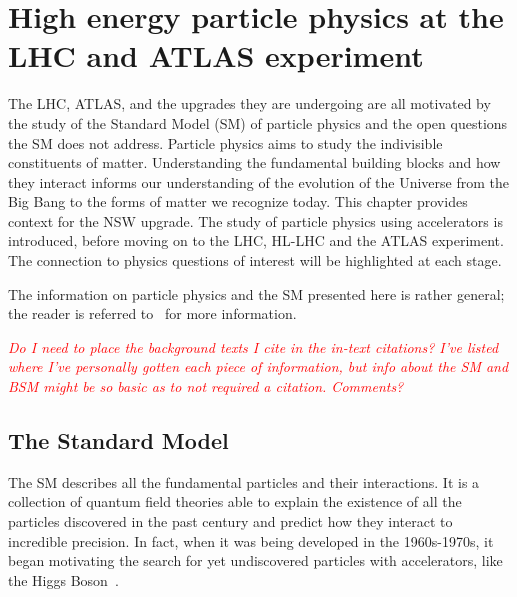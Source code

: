 
\chapter{High energy particle physics at the LHC and ATLAS experiment}
\label{chap:lhc_atlas}


The LHC, ATLAS, and the upgrades they are undergoing are all motivated by the study of the Standard Model (SM) of particle physics and the open questions the SM does not address. Particle physics aims to study the indivisible constituents of matter. Understanding the fundamental building blocks and how they interact informs our understanding of the evolution of the Universe from the Big Bang to the forms of matter we recognize today. This chapter provides context for the NSW upgrade. The study of particle physics using accelerators is introduced, before moving on to the LHC, HL-LHC and the ATLAS experiment. The connection to physics questions of interest will be highlighted at each stage. 

The information on particle physics and the SM presented here is rather general; the reader is referred to~\cite{griffiths_introduction_2011, peskin_introduction_1995, zyla_review_2020} for more information. 

\textcolor{red}{\textit{Do I need to place the background texts I cite in the in-text citations? I've listed where I've personally gotten each piece of information, but info about the SM and BSM might be so basic as to not required a citation. Comments?}}

\section{The Standard Model}

The SM describes all the fundamental particles and their interactions. It is a collection of quantum field theories able to explain the existence of all the particles discovered in the past century and predict how they interact to incredible precision. In fact, when it was being developed in the 1960s-1970s, it began motivating the search for yet undiscovered particles with accelerators, like the Higgs Boson~\cite{brianti_large_1984}. %

